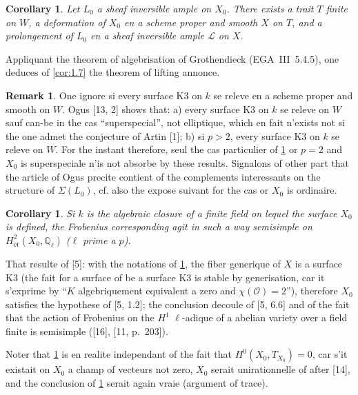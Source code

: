 \documentclass[12pt,a4paper]{article}
\theoremstyle{plain}
\newtheorem{corollary}[theorem]{Corollary}
\theoremstyle{definition}
\newtheorem{remark}[theorem]{Remark}
\theoremstyle{remark}
\begin{document}
\begin{corollary}\label{cor:1.8}
Let $L_0$ a sheaf inversible ample on $X_0$. There exists a trait $T$ finite on $W$, a deformation of $X_0$ en a scheme proper and smooth $X$ on $T$, and a prolongement of $L_0$ en a sheaf inversible ample $\mathcal{L}$ on $X$.
\end{corollary}

Appliquant the theorem of algebrisation of Grothendieck (EGA~III~5.4.5), one deduces of \ref{cor:1.7} the theorem of lifting annonce.

\begin{remark}\label{rem:1.9}
One ignore si every surface K3 on $k$ se releve en a scheme proper and smooth on $W$. Ogus [13, 2] shows that: a) every surface K3 on $k$ se releve on $W$ sauf can-be in the cas ``superspecial'', not elliptique, which en fait n'exists not si the one admet the conjecture of Artin [1]; b) si $p > 2$, every surface K3 on $k$ se releve on $W$. For the instant therefore, seul the cas particulier of \ref{cor:1.8} or $p = 2$ and $X_0$ is superspeciale n'is not absorbe by these results. Signalons of other part that the article of Ogus precite contient of the complements interessants on the structure of $\Sigma(L_0)$, cf. also the expose suivant for the cas or $X_0$ is ordinaire.
\end{remark}

\begin{corollary}\label{cor:1.10}
Si $k$ is the algebraic closure of a finite field on lequel the surface $X_0$ is defined, the Frobenius corresponding agit in such a way semisimple on $H^2_{\mathrm{\acute{e}t}}(X_0, \mathbb{Q}_{\ell})$ ($\ell$ prime a $p$).
\end{corollary}

That resulte of [5]: with the notations of \ref{cor:1.8}, the fiber generique of $X$ is a surface K3 (the fait for a surface of be a surface K3 is stable by generisation, car it s'exprime by ``$K$ algebriquement equivalent a zero and $\chi(\mathcal{O}) = 2$''), therefore $X_0$ satisfies the hypothese of [5, 1.2]; the conclusion decoule of [5, 6.6] and of the fait that the action of Frobenius on the $H^1$ $\ell$-adique of a abelian variety over a field finite is semisimple ([16], [11, p.~203]).

Noter that \ref{cor:1.10} is en realite independant of the fait that $H^0(X_0, T_{X_0}) = 0$, car s'it existait on $X_0$ a champ of vecteurs not zero, $X_0$ serait unirationnelle of after [14], and the conclusion of \ref{cor:1.10} serait again vraie (argument of trace).
\end{document}
